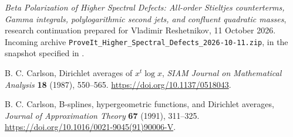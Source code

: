 \emph{Beta Polarization of Higher Spectral Defects:
All-order Stieltjes counterterms, Gamma integrals,
polylogarithmic second jets, and confluent quadratic masses},
research continuation prepared for Vladimir Reshetnikov, 11 October 2026.
Incoming archive \texttt{ProveIt\_Higher\_Spectral\_Defects\_2026-10-11.zip},
in the snapshot specified in \cite{RepoMain}.


B. C. Carlson,
Dirichlet averages of $x^t\log x$,
\emph{SIAM Journal on Mathematical Analysis} \textbf{18} (1987), 550--565.
\url{https://doi.org/10.1137/0518043}.


B. C. Carlson,
B-splines, hypergeometric functions, and Dirichlet averages,
\emph{Journal of Approximation Theory} \textbf{67} (1991), 311--325.
\url{https://doi.org/10.1016/0021-9045(91)90006-V}.
